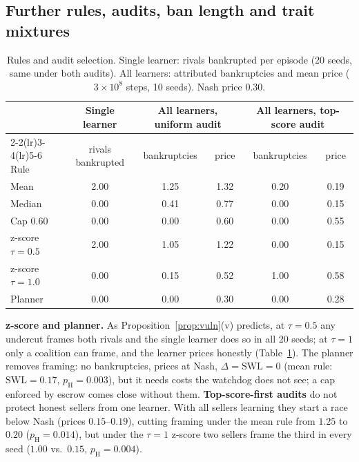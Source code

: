 \documentclass{article}
\begin{document}
\subsection{Further rules, audits, ban length and trait mixtures}\label{sec:more}

\begin{table}[t]
\centering
\caption{Rules and audit selection. Single learner: rivals bankrupted per episode (20 seeds, same under both audits). All learners: attributed bankruptcies and mean price ($3\times10^8$ steps, 10 seeds). Nash price 0.30.}
\label{tab:rules}
\small
\begin{tabular}{@{}lccccc@{}}
\toprule
& Single learner & \multicolumn{2}{c}{All learners, uniform audit} & \multicolumn{2}{c}{All learners, top-score audit} \\
\cmidrule(lr){2-2}\cmidrule(lr){3-4}\cmidrule(lr){5-6}
Rule & rivals bankrupted & bankruptcies & price & bankruptcies & price \\
\midrule
Mean & 2.00 & 1.25 & 1.32 & 0.20 & 0.19 \\
Median & 0.00 & 0.41 & 0.77 & 0.00 & 0.15 \\
Cap 0.60 & 0.00 & 0.00 & 0.60 & 0.00 & 0.55 \\
z-score $\tau{=}0.5$ & 2.00 & 1.05 & 1.22 & 0.00 & 0.15 \\
z-score $\tau{=}1.0$ & 0.00 & 0.15 & 0.52 & 1.00 & 0.58 \\
Planner & 0.00 & 0.00 & 0.30 & 0.00 & 0.28 \\
\bottomrule
\end{tabular}
\end{table}

\textbf{z-score and planner.} As Proposition~\ref{prop:vuln}(v) predicts, at $\tau=0.5$ any undercut frames both rivals and the single learner does so in all 20 seeds; at $\tau=1$ only a coalition can frame, and the learner prices honestly (Table~\ref{tab:rules}). The planner removes framing: no bankruptcies, prices at Nash, $\Delta=\mathrm{SWL}=0$ (mean rule: $\mathrm{SWL}=0.17$, $p_{\mathrm H}=0.003$), but it needs costs the watchdog does not see; a cap enforced by escrow comes close without them. \textbf{Top-score-first audits} do not protect honest sellers from one learner. With all sellers learning they start a race below Nash (prices $0.15$--$0.19$), cutting framing under the mean rule from $1.25$ to $0.20$ ($p_{\mathrm H}=0.014$), but under the $\tau=1$ z-score two sellers frame the third in every seed ($1.00$ vs.\ $0.15$, $p_{\mathrm H}=0.004$).
\end{document}
